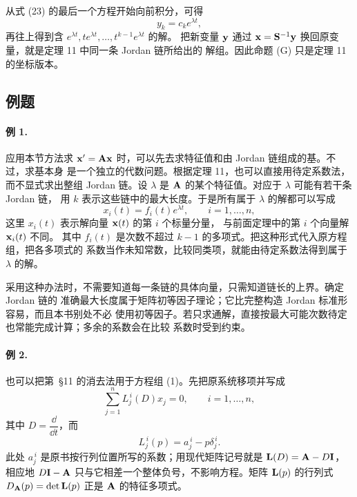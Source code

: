 从式 (23) 的最后一个方程开始向前积分，可得
\[
 y_k=c_ke^{\lambda t},
\]
再往上得到含 \(e^{\lambda t},te^{\lambda t},\ldots,t^{k-1}e^{\lambda t}\) 的解。
把新变量 \(\vect{y}\) 通过 \(\vect{x}=\mat{S}^{-1}\vect{y}\) 换回原变量，就是定理 11 中同一条 Jordan 链所给出的
解组。因此命题 (G) 只是定理 11 的坐标版本。

\subsection*{例题}

\paragraph{例 1.}
应用本节方法求 \(\vect{x}'=\mat{A}\vect{x}\) 时，可以先去求特征值和由 Jordan 链组成的基。不过，求基本身
是一个独立的代数问题。根据定理 11，也可以直接用待定系数法，而不显式求出整组 Jordan
链。设 \(\lambda\) 是 \(\mathbf{A}\) 的某个特征值。对应于 \(\lambda\) 可能有若干条 Jordan 链，
用 \(k\) 表示这些链中的最大长度。于是所有属于 \(\lambda\) 的解都可以写成
\begin{equation}
 x_i(t)=f_i(t)e^{\lambda t},\qquad i=1,\ldots,n,
 \tag{24}
\end{equation}
这里 \(x_i(t)\) 表示解向量 \(\vect{x}(t)\) 的第 \(i\) 个标量分量，
与前面定理中的第 \(i\) 个向量解 \(\vect{x}_i(t)\) 不同。
其中 \(f_i(t)\) 是次数不超过 \(k-1\) 的多项式。把这种形式代入原方程组，把各多项式的
系数当作未知常数，比较同类项，就能由待定系数法得到属于 \(\lambda\) 的解。

采用这种办法时，不需要知道每一条链的具体向量，只需知道链长的上界。确定 Jordan 链的
准确最大长度属于矩阵初等因子理论；它比完整构造 Jordan 标准形容易，而且本书别处不必
使用初等因子。若只求通解，直接按最大可能次数待定也常能完成计算；多余的系数会在比较
系数时受到约束。

\paragraph{例 2.}
也可以把第~\S11 的消去法用于方程组 (1)。先把原系统移项并写成
\begin{equation}
 \sum_{j=1}^{n}L_j^{\,i}(D)x_j=0,\qquad i=1,\ldots,n,
 \tag{25}
\end{equation}
其中 \(D=\dfrac{\dd}{\dd t}\)，而
\[
 L_j^{\,i}(p)=a_j^{\,i}-p\delta_j^{\,i}.
\]
此处 \(a_j^{\,i}\) 是原书按行列位置所写的系数；用现代矩阵记号就是
\(\mathbf{L}(D)=\mathbf{A}-D\mathbf{I}\)，相应地 \(D\mathbf{I}-\mathbf{A}\) 只与它相差一个整体负号，不影响方程。矩阵
\(\mathbf{L}(p)\) 的行列式 \(D_{\mathbf{A}}(p)=\det \mathbf{L}(p)\) 正是 \(\mathbf{A}\) 的特征多项式。


